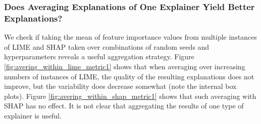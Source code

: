 \documentclass[11pt]{article}    %
\begin{document}
            \subsubsection{Does Averaging Explanations of One Explainer Yield Better Explanations?}
                We check if taking the mean of feature importance values from multiple instances of LIME and SHAP taken over combinations of random seeds and hyperparameters reveals a useful aggregation strategy. Figure \ref{fig:avering_within_lime_metric1} shows that when averaging over increasing numbers of instances of LIME, the quality of the resulting explanations does not improve, but the variability does decrease somewhat (note the internal box plots). Figure \ref{fig:avering_within_shap_metric1} shows that such averaging with SHAP has no effect. It is not clear that aggregating the results of one type of explainer is useful. 
  
    
            

            
            
\end{document}
